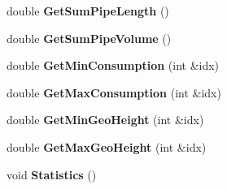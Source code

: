 \begin{DoxyCompactItemize}
double {\bfseries Get\+Sum\+Pipe\+Length} ()
\item 
\mbox{\label{class_staci_a33cc0e549bf466f5613c2234430ddbc1}} 
double {\bfseries Get\+Sum\+Pipe\+Volume} ()
\item 
\mbox{\label{class_staci_a4ffa8fbe32cb738b3aa6223ecd1d34eb}} 
double {\bfseries Get\+Min\+Consumption} (int \&idx)
\item 
\mbox{\label{class_staci_a67d661c84d23d50b78eadaac79648fb1}} 
double {\bfseries Get\+Max\+Consumption} (int \&idx)
\item 
\mbox{\label{class_staci_a6f0b1ea987db6898b02fb0b5ee81c08a}} 
double {\bfseries Get\+Min\+Geo\+Height} (int \&idx)
\item 
\mbox{\label{class_staci_a6698b72588fe59909594948920f16e4e}} 
double {\bfseries Get\+Max\+Geo\+Height} (int \&idx)
\item 
\mbox{\label{class_staci_a185f2c986890fbde90693c7133492b04}} 
void {\bfseries Statistics} ()
\end{DoxyCompactItemize}
